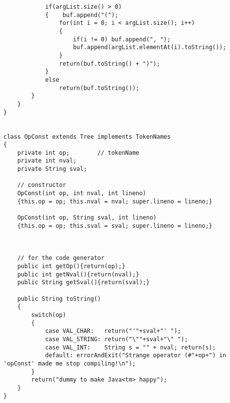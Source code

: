 \begin{footnotesize}
\begin{verbatim}
            if(argList.size() > 0)
            {    buf.append("(");
                for(int i = 0; i < argList.size(); i++)
                {
                    if(i != 0) buf.append(", ");
                    buf.append(argList.elementAt(i).toString());
                }    
                return(buf.toString() + ")");
            }
            else
                return(buf.toString());
        }
    }
}


class OpConst extends Tree implements TokenNames
{
    private int op;        // tokenName
    private int nval;    
    private String sval;
        
    // constructor
    OpConst(int op, int nval, int lineno)
    {this.op = op; this.nval = nval; super.lineno = lineno;}
    
    OpConst(int op, String sval, int lineno)
    {this.op = op; this.sval = sval; super.lineno = lineno;}
    
    
    
    // for the code generator
    public int getOp(){return(op);}
    public int getNval(){return(nval);}
    public String getSval(){return(sval);}
        
    public String toString()
    {
        switch(op)
        {
            case VAL_CHAR:   return("'"+sval+"' ");
            case VAL_STRING: return("\""+sval+"\" ");
            case VAL_INT:    String s = "" + nval; return(s); 
            default: errorAndExit("Strange operator (#"+op+") in 'opConst' made me stop compiling!\n");
        }    
        return("dummy to make Java<tm> happy");
    }
}
\end{verbatim}\end{footnotesize}
